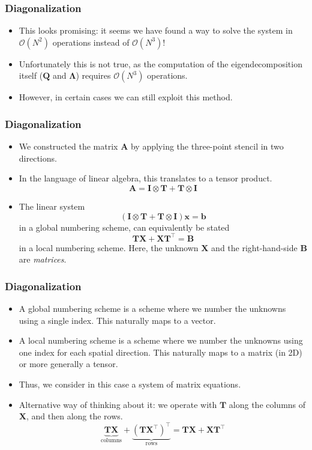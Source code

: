 \begin{frame}
  \frametitle{Diagonalization}
  \begin{itemize}
  \item This looks promising: it seems we have found a way to solve the system
    in $\mathcal{O}(N^2)$ operations instead of $\mathcal{O}(N^3)$!
  \item Unfortunately this is not true, as the computation of the
    eigendecomposition itself ($\bm Q$ and $\bm \Lambda$) requires
    $\mathcal{O}(N^3)$ operations.
  \item However, in certain cases we can still exploit this method.
  \end{itemize}
\end{frame}

\begin{frame}
  \frametitle{Diagonalization}
  \begin{itemize}
  \item We constructed the matrix $\bm A$ by applying the three-point stencil in
    two directions.
  \item In the language of linear algebra, this translates to a tensor product.
    \[ \bm A = \bm I \otimes \bm T + \bm T \otimes \bm I \]
  \item The linear system
    \[ \left( \bm I \otimes \bm T + \bm T \otimes \bm I \right) \bm x = \bm b \]
    in a global numbering scheme, can equivalently be stated
    \[ \bm T \bm X + \bm X \bm T^\intercal = \bm B \]
    in a local numbering scheme. Here, the unknown $\bm X$ and the
    right-hand-side $\bm B$ are \emph{matrices}.
  \end{itemize}
\end{frame}

\begin{frame}
  \frametitle{Diagonalization}
  \begin{itemize}
  \item A global numbering scheme is a scheme where we number the unknowns using
    a single index. This naturally maps to a vector.
  \item A local numbering scheme is a scheme where we number the unknowns using
    one index for each spatial direction. This naturally maps to a matrix (in
    2D) or more generally a tensor.
  \item Thus, we consider in this case a system of matrix equations.
  \item Alternative way of thinking about it: we operate with $\bm T$ along the
    columns of $\bm X$, and then along the rows.
    \[
      \underbrace{\bm T \bm X}_{\text{columns}} +
      \underbrace{\left( \bm T \bm X^\intercal \right)^\intercal}_{\text{rows}}
      = \bm T \bm X + \bm X \bm T^\intercal
    \]
  \end{itemize}
\end{frame}

